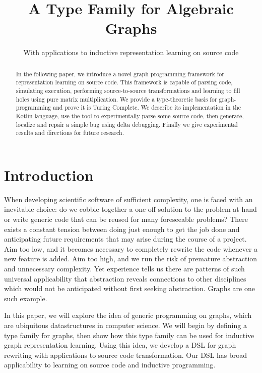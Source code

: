 \documentclass[sigplan,10pt,review,anonymous]{acmart}
\begin{document}
\title{A Type Family for Algebraic Graphs}
\subtitle{With applications to inductive representation learning on source code}
\begin{abstract}
In the following paper, we introduce a novel graph programming framework for representation learning on source code. This framework is capable of parsing code, simulating execution, performing source-to-source transformations and learning to fill holes using pure matrix multiplication. We provide a type-theoretic basis for graph-programming and prove it is Turing Complete. We describe its implementation in the Kotlin language, use the tool to experimentally parse some source code, then generate, localize and repair a simple bug using delta debugging. Finally we give experimental results and directions for future research.
\end{abstract}
\maketitle

\section{Introduction}

When developing scientific software of sufficient complexity, one is faced with an inevitable choice: do we cobble together a one-off solution to the problem at hand or write generic code that can be reused for many foreseeable problems? There exists a constant tension between doing just enough to get the job done and anticipating future requirements that may arise during the course of a project. Aim too low, and it becomes necessary to completely rewrite the code whenever a new feature is added. Aim too high, and we run the risk of premature abstraction and unnecessary complexity. Yet experience tells us there are patterns of such universal applicability that abstraction reveals connections to other disciplines which would not be anticipated without first seeking abstraction. Graphs are one such example.

In this paper, we will explore the idea of generic programming on graphs, which are ubiquitous datastructures in computer science. We will begin by defining a type family for graphs, then show how this type family can be used for inductive graph representation learning. Using this idea, we develop a DSL for graph rewriting with applications to source code transformation. Our DSL has broad applicability to learning on source code and inductive programming.
\end{document}
